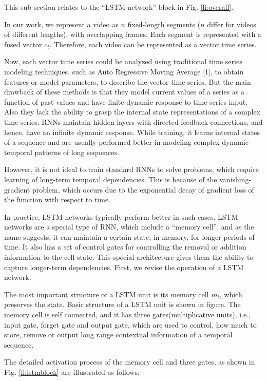 This sub section relates to
the ``LSTM network'' block in Fig. \ref{fi:overall}.

In our work, we represent a video as $n$
fixed-length segments ($n$ differ for videos of different lengths),  with overlapping frames.  Each segment
is represented with a fused vector $c_{t}$. Therefore, each video can be represented as a vector time series.


Now, each vector time series could be  analyzed using traditional time series modeling techniques,
such as Auto Regressive Moving Average [1], to obtain features or model parameters, to describe the
vector time series.
But the main drawback of these methods is that they model current values of a series as a function of past values
and have finite dynamic response to time series input. Also they lack the ability to grasp the internal state
representations of a complex time series. RNNs maintain hidden layers with directed feedback connections, and hence,
have an infinite dynamic response. While training, it learns internal states of a sequence
and are usually performed better in modeling complex dynamic temporal patterns of long sequences.


However, it is not ideal to train standard RNNs to solve problems,
which require learning of long-term temporal dependencies. This is because of the vanishing-gradient problem, which occurs
due to the exponential decay of gradient loss of the function with respect to time.

In practice, LSTM networks typically perform better in such cases.
LSTM networks are a special type of RNN, which include a ``memory cell'', and as the name suggests,
it can maintain a certain state, in memory, for longer periods of time.
It also has a set of control gates for controlling the removal or addition information to the cell state.
This special architecture gives them the ability to capture longer-term dependencies. First, we revise the operation of a LSTM
network.

The most important structure of a LSTM unit is its memory cell $m_{t}$, which preserves the state. Basic structure of a LSTM
unit is shown in figure. The memory cell is self connected, and it has three gates(multiplicative units), i.e., input gate, forget gate and
output gate, which are used to control, how much to store, remove or output long range contextual information of a temporal sequence.

The detailed activation process of the memory cell and three gates, as shown in Fig. \ref{fi:lstmblock} are
illustrated as follows:


